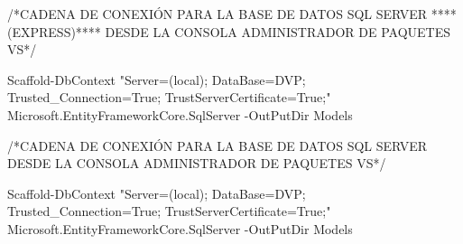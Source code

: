 /*CADENA DE CONEXIÓN PARA LA BASE DE DATOS SQL SERVER ****(EXPRESS)****
  DESDE LA CONSOLA ADMINISTRADOR DE PAQUETES VS*/

Scaffold-DbContext "Server=(local)\SQLEXPRESS; DataBase=DVP; Trusted_Connection=True; TrustServerCertificate=True;" Microsoft.EntityFrameworkCore.SqlServer -OutPutDir Models


/*CADENA DE CONEXIÓN PARA LA BASE DE DATOS SQL SERVER
  DESDE LA CONSOLA ADMINISTRADOR DE PAQUETES VS*/
  
Scaffold-DbContext "Server=(local); DataBase=DVP; Trusted_Connection=True; TrustServerCertificate=True;" Microsoft.EntityFrameworkCore.SqlServer -OutPutDir Models
